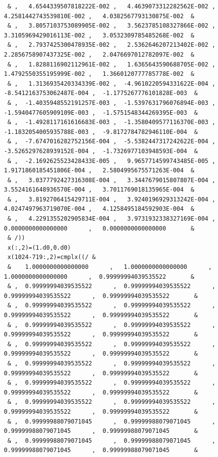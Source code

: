 \documentclass[a4paper,10pt]{report}
\begin{document}
{\begin{verbatim}
 & ,   4.6544339507818222E-002 ,   4.4639073312282562E-002 ,   4.2581442743539810E-002 ,   4.0382567793130875E-002  &
 & ,   3.8057103753089905E-002 ,   3.5623785108327866E-002 ,   3.3105969429016113E-002 ,   3.0532309785485268E-002  &
 & ,   2.7937425300478935E-002 ,   2.5362646207213402E-002 ,   2.2856758907437325E-002 ,   2.0476697012782097E-002  &
 & ,   1.8288116902112961E-002 ,   1.6365643590688705E-002 ,   1.4792550355195999E-002 ,   1.3660120777785778E-002  &
 & ,   1.3136935420334339E-002 ,  -4.9610220594331622E-004 ,  -8.5412163753062487E-004 ,  -1.1775267776101828E-003  &
 & ,  -1.4035948552191257E-003 ,  -1.5397631796076894E-003 ,  -1.5940477605909109E-003 ,  -1.5751548344269395E-003  &
 & ,  -1.4928117161616683E-003 ,  -1.3580409577116370E-003 ,  -1.1832054005935788E-003 ,  -9.8172784782946110E-004  &
 & ,  -7.6747016282752156E-004 ,  -5.5382447317242622E-004 ,  -3.5265297628939152E-004 ,  -1.7326977103948593E-004  &
 & ,  -2.1692625523428433E-005 ,   9.9657714599743485E-005 ,   1.9171860185451806E-004 ,   2.5804995675571263E-004  &
 & ,   3.0377792427316308E-004 ,   3.3447679015807807E-004 ,   3.5524161648936570E-004 ,   3.7011769018135965E-004  &
 & ,   3.8192706415429711E-004 ,   3.9240196929313242E-004 ,   4.0247497963719070E-004 ,   4.1258495184592903E-004  &
 & ,   4.2291355202905834E-004 ,   3.9731932338327169E-004 ,   0.0000000000000000      ,   0.0000000000000000       &
 & /))
 x(:,2)=(1.d0,0.d0)      
 x(1024-719:,2)=cmplx((/ &
 &    1.0000000000000000      ,   1.0000000000000000      ,   1.0000000000000000      ,  0.99999994039535522       &
 & ,  0.99999994039535522      ,  0.99999994039535522      ,  0.99999994039535522      ,  0.99999994039535522       &
 & ,  0.99999994039535522      ,  0.99999994039535522      ,  0.99999994039535522      ,  0.99999994039535522       &
 & ,  0.99999994039535522      ,  0.99999994039535522      ,  0.99999994039535522      ,  0.99999994039535522       &
 & ,  0.99999994039535522      ,  0.99999994039535522      ,  0.99999994039535522      ,  0.99999994039535522       &
 & ,  0.99999994039535522      ,  0.99999994039535522      ,  0.99999994039535522      ,  0.99999994039535522       &
 & ,  0.99999994039535522      ,  0.99999994039535522      ,  0.99999994039535522      ,  0.99999994039535522       &
 & ,  0.99999994039535522      ,  0.99999994039535522      ,  0.99999994039535522      ,  0.99999994039535522       &
 & ,  0.99999988079071045      ,  0.99999988079071045      ,  0.99999988079071045      ,  0.99999988079071045       &
 & ,  0.99999988079071045      ,  0.99999988079071045      ,  0.99999988079071045      ,  0.99999988079071045       &

\end{verbatim}}
\end{document}
